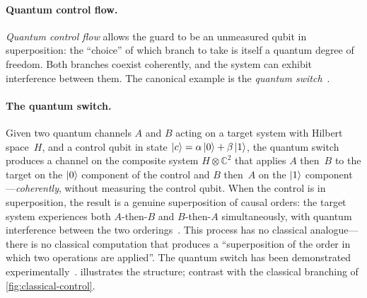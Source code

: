 \paragraph{Quantum control flow.}
\emph{Quantum control flow} allows the guard to be an unmeasured
qubit in superposition: the ``choice'' of which branch to take is
itself a quantum degree of freedom.
Both branches coexist coherently, and the system can exhibit
interference between them.
The canonical example is the \emph{quantum switch}~\cite{CDPV2013}.

\paragraph{The quantum switch.}
Given two quantum channels $A$ and $B$ acting on a target system with
Hilbert space~$H$, and a control qubit in state
$\ket{c} = \alpha\ket{0} + \beta\ket{1}$, the quantum switch
produces a channel on the composite system
$H \otimes \mathbb{C}^2$ that applies $A$ then~$B$ to the target on
the $\ket{0}$ component of the control and $B$ then~$A$ on the
$\ket{1}$ component---\emph{coherently}, without measuring the
control qubit.
When the control is in superposition, the result is a genuine
superposition of causal orders: the target system experiences both
$A$-then-$B$ and $B$-then-$A$ simultaneously, with quantum
interference between the two orderings~\cite{CDPV2013}.
This process has no classical analogue---there is no classical
computation that produces a ``superposition of the order in which two
operations are applied''.
The quantum switch has been demonstrated
experimentally~\cite{RichterEtAl2025}.
 illustrates the structure; contrast with
the classical branching of \cref{fig:classical-control}.

